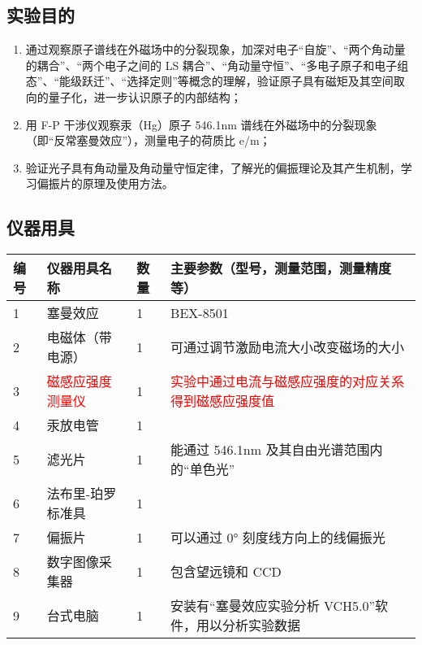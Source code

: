 \documentclass[dvipsnames, svgnames,a4paper,11pt]{article}
\begin{document}
\subsection{实验目的}

	\begin{enumerate}
		\item 通过观察原子谱线在外磁场中的分裂现象，加深对电子“自旋”、“两个角动量的耦合”、“两个电子之间的 LS 耦合”、“角动量守恒”、“多电子原子和电子组态”、“能级跃迁”、“选择定则”等概念的理解，验证原子具有磁矩及其空间取向的量子化，进一步认识原子的内部结构；
		\item 用 F-P 干涉仪观察汞（Hg）原子 546.1nm 谱线在外磁场中的分裂现象（即“反常塞曼效应”），测量电子的荷质比 e/m；
		\item 验证光子具有角动量及角动量守恒定律，了解光的偏振理论及其产生机制，学习偏振片的原理及使用方法。
	\end{enumerate}

\subsection{仪器用具}
\begin{table}[htbp]
    \centering
    \renewcommand\arraystretch{1.6}
    \begin{tabular}{p{}|p{}|p{}|p{}}
        \hline
        编号 & 仪器用具名称 & 数量 & 主要参数（型号，测量范围，测量精度等） \\
        \hline
        1 & 塞曼效应 & 1 & BEX-8501 \\
        2 & 电磁体（带电源） & 1 & 可通过调节激励电流大小改变磁场的大小 \\
        3 & \textcolor{red}{磁感应强度测量仪} & 1 & \textcolor{red}{实验中通过电流与磁感应强度的对应关系得到磁感应强度值} \\
        4 & 汞放电管 & 1 & \\
        5 & 滤光片 & 1 & 能通过 546.1nm 及其自由光谱范围内的“单色光” \\
        6 & 法布里-珀罗标准具 & 1 &  \\
        7 & 偏振片 & 1 & 可以通过 0° 刻度线方向上的线偏振光\\
        8 & 数字图像采集器 & 1 & 包含望远镜和 CCD \\
        9 & 台式电脑 & 1 & 安装有“塞曼效应实验分析 VCH5.0”软件，用以分析实验数据 \\
        \hline
    \end{tabular}
\end{table}
\end{document}
